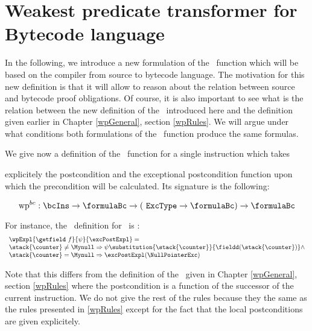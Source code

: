 
\newtheorem{wpSeq}{Definition}[section]
\newtheorem{wpExpr}[wpSeq]{Definition}


\section{Weakest predicate transformer for Bytecode language} \label{pog:wpBc}
In the following, we introduce a new formulation of the \wpName \ function 
which will be based on the compiler from source to bytecode  language.
The motivation for this new definition is that it will allow to reason about the
 relation between source and bytecode proof
obligations. 
Of course, it is also important to see what is the relation between the new definition
of the \wpName \ introduced here and the definition  given earlier in Chapter \ref{wpGeneral}, section \ref{wpRules}. 
We will argue under what conditions both formulations of the \wpName \ function produce the same formulas.



 



We give now a definition of the \wpName \ function for a single instruction which takes


explicitely the postcondition and the exceptional postcondition function 
upon which the precondition will be calculated. Its signature is the following:

$$ \mbox{\rm\textrm{wp}}^{bc} : \bcIns \rightarrow \formulaBc \rightarrow ( \mbox{ \rm \texttt{ExcType}} \rightarrow \formulaBc ) \rightarrow \formulaBc$$

For instance, the \wpName \ definition for \getfield \ is :
$$ \begin{array}{l} \wpExpl{\getfield \ f }{ \psi  }{ \excPostExpl} = \\
		         \stack{\counter } \neq \Mynull \Rightarrow 
			                \psi   \substitution{ \stack{\counter} }{ \fieldd(\stack{\counter})} 		                    
			  \wedge \\
			  \stack{\counter }  = \Mynull  \Rightarrow   \excPostExpl( \NullPointerExc )
			  \end{array}$$ 

Note that this differs from the definition of the \wpName \  given in Chapter \ref{wpGeneral}, section \ref{wpRules} where the postcondition 
is a function of the successor of the current instruction. We do not give the rest of the rules because they the same as the rules presented in \ref{wpRules} except
for the fact that the local postconditions are given explicitely.

